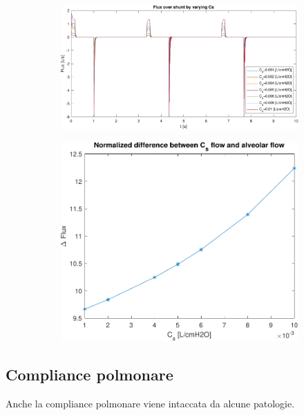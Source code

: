 \begin{figure}[t!]
	\begin{subfigure}{0.6\linewidth}
		\centering
		\includegraphics[width=0.95\linewidth]{../model/data_log/Cs_fluxCS.pdf}
		\caption{}
	\end{subfigure}\hfill
	\begin{subfigure}{0.4\linewidth}
		\centering
		\includegraphics[width=0.95\linewidth]{../model/data_log/CwCL_deltaflux.pdf}
		\caption{}
	\end{subfigure}\hfill
	\caption{}
\end{figure}



\subsection{Compliance polmonare}

Anche la compliance polmonare viene intaccata da alcune patologie.

